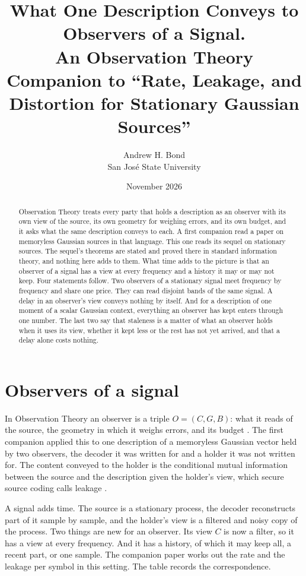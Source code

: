 \documentclass[11pt]{article}
\title{What One Description Conveys to Observers of a Signal.\\[4pt]
\large An Observation Theory Companion to ``Rate, Leakage, and Distortion for Stationary Gaussian Sources''}
\author{Andrew H. Bond\\ San Jos\'e State University}
\date{November 2026}
\begin{document}
\maketitle

\begin{abstract}
Observation Theory treats every party that holds a description as an
observer with its own view of the source, its own geometry for weighing
errors, and its own budget, and it asks what the same description
conveys to each. A first companion read a paper on memoryless Gaussian
sources in that language. This one reads its sequel on stationary
sources. The sequel's theorems are stated and proved there in standard
information theory, and nothing here adds to them. What time adds to
the picture is that an observer of a signal has a view at every
frequency and a history it may or may not keep. Four statements follow.
Two observers of a stationary signal meet frequency by frequency and
share one price. They can read disjoint bands of the same signal. A
delay in an observer's view conveys nothing by itself. And for a
description of one moment of a scalar Gaussian context, everything an
observer has kept enters through one number. The last two say that staleness is a matter of what
an observer holds when it uses its view, whether it kept less or the
rest has not yet arrived, and that a delay alone costs nothing.
\end{abstract}

\section{Observers of a signal}
\label{sec:intro}

In Observation Theory an observer is a triple $O=(C,G,B)$: what it reads
of the source, the geometry in which it weighs errors, and its budget
\cite{obsrep}. The first companion \cite{supp1} applied this to one
description of a memoryless Gaussian vector held by two observers, the
decoder it was written for and a holder it was not written for. The
content conveyed to the holder is the conditional mutual information
between the source and the description given the holder's view, which
secure source coding calls leakage \cite{villard2013}.

A signal adds time. The source is a stationary process, the decoder
reconstructs part of it sample by sample, and the holder's view is a
filtered and noisy copy of the process. Two things are new for an
observer. Its view $C$ is now a filter, so it has a view at every
frequency. And it has a history, of which it may keep all, a recent
part, or one sample. The companion paper \cite{paper2} works out the
rate and the leakage per symbol in this setting. The table records the
correspondence.
\end{document}
